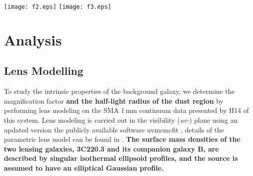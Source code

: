 \documentclass[iop, revtex4]{emulateapj}
\newcommand{\CO}{\mbox{CO($J$\,=\,3\,$\rightarrow$\,2) }}
\newcommand{\pmOne}{\mbox{$^{-1}$}}
\begin{document}
\begin{figure*}[tbph]
\centering
\texttt{[image: f2.eps]}
\texttt{[image: f3.eps]}
\caption{Top Left: Continuum-subtracted moment-0 map of \CO line emission toward
the background SMG with $\sigma$\,=\,1.03\,Jy\,\,km\,\,s\pmOne\ beam\pmOne\ over a velocity range of $\Delta v$\,$\sim$\,514\,km\,\,s\pmOne. The beam size is 11$\farcs$5\,$\times$\,6, at P.A.\,=\,$-$56\degr, as indicated in the bottom left corner.
Top Right: Velocity-integrated \CO line emission (red contours) overlaid on the SMA 1\,mm dust continuum (green contours and grayscale; H14), with an rms noise of $\sigma_\textrm{1\,mm}$\,=\,0.84 mJy beam\pmOne. The beam size of the SMA observations is 1$ \times $1, P.A. $-$34\degr, as shown
in the bottom left corner.
The central cross on each image corresponds to the same coordinates as in Figure~\ref{fig:cont}. The contour levels 
in both images
start at $\pm$3$\sigma$, incrementing at
steps of $\pm$1$\sigma$.
Bottom:
Spectrum extracted at the peak position of CO line emission, with a spectral resolution of $\Delta v$ $\sim$\,29 km\,\,s\pmOne, and an rms of $\sigma_\textrm{ch}$\,=\,9.5 mJy beam\pmOne\ per channel. The
solid black line shows a Gaussian fit to the \CO line profile, where the velocity scale is relative to $z$\,=\,2.221.
\label{fig:mom0}}
\end{figure*}


\section{Analysis}
\subsection{Lens Modelling} \label{sec:Lens}
To study the intrinsic properties of the background galaxy, we determine the magnification factor {\bf and the half-light radius of the dust region} by performing
lens modeling on the SMA 1\,mm continuum data presented by H14 of this system. 
Lens modeling is carried out in the visibility
({\it uv-}) plane using an updated version the publicly available software {\sc uvmcmcfit} \citep{uvmcmcfit15a},
details of the parametric lens model can be found in \citet{Bussmann15a}. 
{\bf The surface mass densities of the two lensing galaxies, 3C220.3 and its companion galaxy B, are described by singular isothermal ellipsoid profiles, and the source is assumed to have an
elliptical Gaussian profile. }
\end{document}

